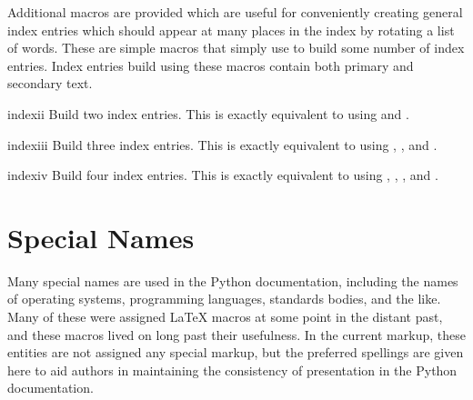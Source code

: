 \documentclass{howto}
\begin{document}
    Additional macros are provided which are useful for conveniently
    creating general index entries which should appear at many places
    in the index by rotating a list of words.  These are simple macros
    that simply use  to build some number of index
    entries.  Index entries build using these macros contain both
    primary and secondary text.

    \begin{macrodesc}{indexii}{}
      Build two index entries.  This is exactly equivalent to using
       and 
      .
    \end{macrodesc}

    \begin{macrodesc}{indexiii}{}
      Build three index entries.  This is exactly equivalent to using
      ,
      , and
      .
    \end{macrodesc}

    \begin{macrodesc}{indexiv}{}
      Build four index entries.  This is exactly equivalent to using
      ,
      ,
      ,
      and
      .
    \end{macrodesc}


\section{Special Names}

  Many special names are used in the Python documentation, including
  the names of operating systems, programming languages, standards
  bodies, and the like.  Many of these were assigned \LaTeX{} macros
  at some point in the distant past, and these macros lived on long
  past their usefulness.  In the current markup, these entities are
  not assigned any special markup, but the preferred spellings are
  given here to aid authors in maintaining the consistency of
  presentation in the Python documentation.
\end{document}
